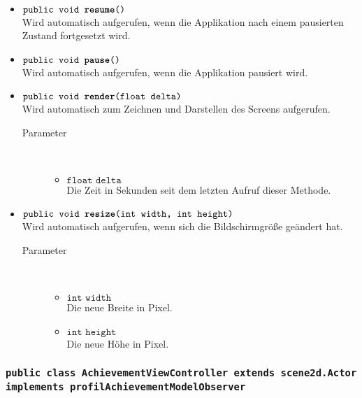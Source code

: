\begin{description}
\begin{itemize}
		\item $\texttt{public void \textbf{resume}()}$ \\ Wird automatisch aufgerufen, wenn die Applikation nach einem pausierten Zustand fortgesetzt wird.	
	
		\item $\texttt{public void \textbf{pause}()}$ \\ Wird automatisch aufgerufen, wenn die Applikation pausiert wird.
	
		\item $\texttt{public void \textbf{render}(float delta)}$ \\ Wird automatisch zum Zeichnen und Darstellen des Screens aufgerufen.
		\begin{description}
			\item[Parameter] \hfill \\
			\vspace{-.8cm}
			\begin{itemize}
				\item $\texttt{float delta}$ \\ Die Zeit in Sekunden seit dem letzten Aufruf dieser Methode.
			\end{itemize}
		\end{description}	
	
		\item $\texttt{public void \textbf{resize}(int width, int height)}$ \\ Wird automatisch aufgerufen, wenn sich die Bildschirmgröße geändert hat.
		\begin{description}
			\item[Parameter] \hfill \\
			\vspace{-.8cm}
			\begin{itemize}
				\item $\texttt{int width}$ \\ Die neue Breite in Pixel.
				\item $\texttt{int height}$ \\ Die neue Höhe in Pixel.
			\end{itemize}
		\end{description}
		
	\end{itemize}
\end{description}

\subsubsection{\normalfont \texttt{public class \textbf{AchievementViewController} extends scene2d.Actor implements profilAchievementModelObserver}}

